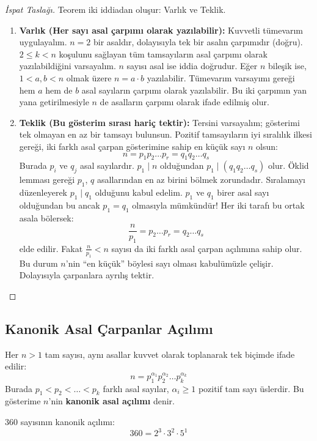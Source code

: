 \begin{proof}[İspat Taslağı]
Teorem iki iddiadan oluşur: Varlık ve Teklik.
\begin{enumerate}
    \item \textbf{Varlık (Her sayı asal çarpımı olarak yazılabilir):}
    Kuvvetli tümevarım uygulayalım. $n = 2$ bir asaldır, dolayısıyla tek bir asalın çarpımıdır (doğru).
    $2 \le k < n$ koşulunu sağlayan tüm tamsayıların asal çarpımı olarak yazılabildiğini varsayalım.
    $n$ sayısı asal ise iddia doğrudur. Eğer $n$ bileşik ise, $1 < a, b < n$ olmak üzere $n = a \cdot b$ yazılabilir.
    Tümevarım varsayımı gereği hem $a$ hem de $b$ asal sayıların çarpımı olarak yazılabilir. Bu iki çarpımın yan yana getirilmesiyle $n$ de asalların çarpımı olarak ifade edilmiş olur.
    
    \item \textbf{Teklik (Bu gösterim sırası hariç tektir):}
    Tersini varsayalım; gösterimi tek olmayan en az bir tamsayı bulunsun. Pozitif tamsayıların iyi sıralılık ilkesi gereği, iki farklı asal çarpan gösterimine sahip en küçük sayı $n$ olsun:
    \[ n = p_1 p_2 \dots p_r = q_1 q_2 \dots q_s \]
    Burada $p_i$ ve $q_j$ asal sayılardır. $p_1 \mid n$ olduğundan $p_1 \mid (q_1 q_2 \dots q_s)$ olur. Öklid lemması gereği $p_1$, $q$ asallarından en az birini bölmek zorundadır. Sıralamayı düzenleyerek $p_1 \mid q_1$ olduğunu kabul edelim.
    $p_1$ ve $q_1$ birer asal sayı olduğundan bu ancak $p_1 = q_1$ olmasıyla mümkündür!
    Her iki tarafı bu ortak asala bölersek:
    \[ \frac{n}{p_1} = p_2 \dots p_r = q_2 \dots q_s \]
    elde edilir. Fakat $\frac{n}{p_1} < n$ sayısı da iki farklı asal çarpan açılımına sahip olur. Bu durum $n$'nin ``en küçük'' böylesi sayı olması kabulümüzle çelişir. Dolayısıyla çarpanlara ayrılış tektir.
\end{enumerate}
\end{proof}

\subsection{Kanonik Asal Çarpanlar Açılımı}

Her $n > 1$ tam sayısı, aynı asallar kuvvet olarak toplanarak tek biçimde ifade edilir:
\[ n = p_1^{\alpha_1} p_2^{\alpha_2} \dots p_k^{\alpha_k} \]
Burada $p_1 < p_2 < \dots < p_k$ farklı asal sayılar, $\alpha_i \ge 1$ pozitif tam sayı üslerdir. Bu gösterime $n$'nin \textbf{kanonik asal açılımı} denir.

\begin{example}
$360$ sayısının kanonik açılımı:
\[ 360 = 2^3 \cdot 3^2 \cdot 5^1 \]
\end{example}


